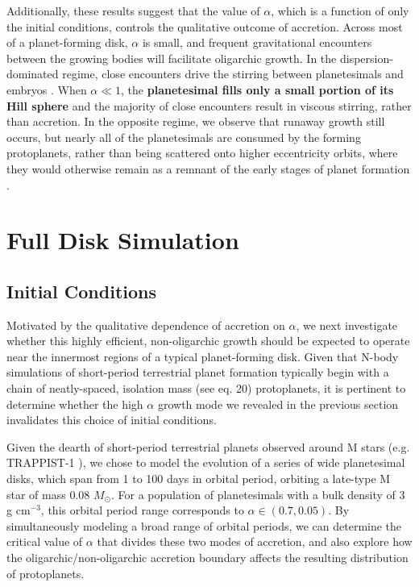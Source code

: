 \documentclass[twocolumn,linenumbers]{aastex63}
\begin{document}
Additionally, these results suggest that the value of $\alpha$, which is a function of only the initial conditions, controls the qualitative outcome of accretion. 
Across most of a planet-forming disk, $\alpha$ is small, and frequent gravitational encounters between the growing bodies will 
facilitate oligarchic growth. In the dispersion-dominated regime, close encounters drive the stirring between planetesimals and 
embryos \citep{weidenschilling89, ida90}. When $\alpha \ll 1$, the \textbf{planetesimal fills only a small portion of its Hill sphere} and the majority of close encounters result in viscous stirring, rather than accretion. In the opposite regime, we 
observe that runaway growth still occurs, but nearly all of the planetesimals are consumed by the forming protoplanets, rather 
than being scattered onto higher eccentricity orbits, where they would otherwise remain as a remnant of the early stages of 
planet formation \citep{kokubo98, kokubo00}.

\section{Full Disk Simulation}\label{sec:fulldisk}

\subsection{Initial Conditions}

Motivated by the qualitative dependence of accretion on $\alpha$,
we next investigate whether this highly efficient, non-oligarchic
growth should be expected to operate near the innermost regions of a typical planet-forming
disk. Given that N-body simulations of short-period terrestrial planet formation 
typically begin with a chain of neatly-spaced, isolation mass 
(see \citet{kokubo00} eq. 20) protoplanets, it is pertinent to determine 
whether the high $\alpha$ growth mode we revealed
in the previous section invalidates this choice of initial conditions.

Given the dearth of short-period terrestrial planets observed around M stars (e.g. TRAPPIST-1 \citep{gillon16, gillon17, agol21}), we chose to model the evolution of a series of wide planetesimal disks, which span from 1 to 100 days in orbital period, orbiting a late-type M star of mass 0.08 $M_{\odot}$. For a population of planetesimals with a bulk density of 3 g cm$^{-3}$, this orbital period range corresponds to $\alpha \in (0.7, 0.05)$. By simultaneously modeling a broad range of orbital periods, we can determine the critical value of $\alpha$ that divides these two modes of accretion, and also explore how the oligarchic/non-oligarchic accretion boundary affects the resulting distribution of protoplanets.
\end{document}
